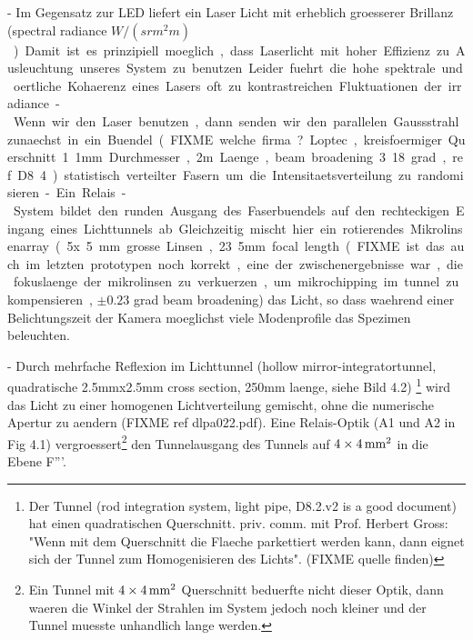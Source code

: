  - Im Gegensatz zur LED liefert ein Laser Licht mit erheblich
   groesserer Brillanz (spectral radiance \unit[]{$W/(sr m^2 m)$}). Damit ist es
   prinzipiell moeglich, dass Laserlicht mit hoher Effizienz zu         %
   Ausleuchtung unseres System zu benutzen. Leider fuehrt die hohe
   spektrale und oertliche Kohaerenz eines Lasers oft zu
   kontrastreichen Fluktuationen der irradiance.

 - Wenn wir den Laser benutzen, dann senden wir den parallelen
   Gaussstrahl zunaechst in ein Buendel (FIXME welche firma? Loptec,
   kreisfoermiger Querschnitt 1.1mm Durchmesser, 2m Laenge, beam        %
   broadening 3.18 grad, ref D8.4) statistisch verteilter Fasern um
   die Intensitaetsverteilung zu randomisieren.
   
 - Ein Relais-System bildet den runden Ausgang des Faserbuendels auf
   den rechteckigen Eingang eines Lichttunnels ab. Gleichzeitig mischt
   hier ein rotierendes Mikrolinsenarray (.5x.5 mm grosse Linsen,
   23.5mm focal length (FIXME ist das auch im letzten prototypen noch
   korrekt, eine der zwischenergebnisse war, die fokuslaenge der
   mikrolinsen zu verkuerzen, um mikrochipping im tunnel zu
   kompensieren , $\pm0.23$ grad beam broadening) das Licht, so dass
   waehrend einer Belichtungszeit der Kamera moeglichst viele
   Modenprofile das Spezimen beleuchten.

 - Durch mehrfache Reflexion im Lichttunnel (hollow
   mirror-integratortunnel, quadratische 2.5mmx2.5mm cross section,  %
   250mm laenge, siehe Bild 4.2) \footnote{Der
   Tunnel (rod integration system, light pipe, D8.2.v2 is a good
   document) hat einen quadratischen Querschnitt. priv. comm. mit
   Prof. Herbert Gross: "Wenn mit dem Querschnitt die Flaeche
   parkettiert werden kann, dann eignet sich der Tunnel zum
   Homogenisieren des Lichts". (FIXME quelle finden)} wird das Licht
   zu einer homogenen Lichtverteilung gemischt, ohne die numerische
   Apertur zu aendern (FIXME ref dlpa022.pdf).  Eine Relais-Optik (A1
   und A2 in Fig 4.1) vergroessert\footnote{Ein Tunnel mit $\unit[4\times4]{mm^2}$
   Querschnitt beduerfte nicht dieser Optik, dann waeren die Winkel
   der Strahlen im System jedoch noch kleiner und der Tunnel muesste
   unhandlich lange werden.} 
   den Tunnelausgang des Tunnels auf $\unit[4\times4]{mm^2}$
   in die Ebene F'''.




